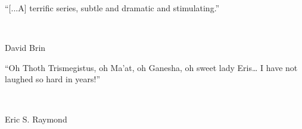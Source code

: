 \makeatletter
\newlength{\beforeblurbskip}
  \setlength{\beforeblurbskip}{.5\baselineskip}
\newlength{\afterblurbskip}
  \setlength{\afterblurbskip}{.5\baselineskip}
\newlength{\blurbwidth}
  \setlength{\blurbwidth}{.6\textwidth}
\newlength{\blurbrule}
  \setlength{\blurbrule}{.4\p@}
\newcommand{\blurbsize}{\small}
\newcommand{\blurbflush}{flushright}

\newcommand{\blurbfontsize}[1]{\def\blurbsize{#1}}
\newcommand{\blurbposition}[1]{\long\def\blurbflush{#1}}
\newcommand{\blurbtextposition}[1]{\def\textflush{#1}}
\newcommand{\blurbsourceposition}[1]{\def\sourceflush{#1}}

\newcommand{\@blurbrule}{\rule[.5ex]{\blurbwidth}{\blurbrule}}

\newcommand{\@blurbtext}[1]{%
  \begin{minipage}{\blurbwidth}\begin{\textflush} #1\par
    \ifdim\blurbrule>\z@ \@blurbrule \else \vspace*{1ex} \fi
  \end{\textflush}\end{minipage}}

  \newcommand{\@blurbsource}[1]{%
  \begin{minipage}{\blurbwidth}
    \begin{\sourceflush} #1\par
  \end{\sourceflush}\end{minipage}}

\newcommand{\blurb}[2]{
	\vspace{\beforeblurbskip} 
	{\blurbsize
	\begin{\blurbflush}
		\begin{minipage}{8cm} \@blurbtext{#1}\\ \@blurbsource{#2} \end{minipage}
	\end{\blurbflush} 
	\vspace{\afterblurbskip}}}
\makeatother

\thispagestyle{empty}
\blurb{“[...A] terrific series, subtle and dramatic and stimulating.”}{David Brin}
\blurb{“Oh Thoth Trismegistus, oh Ma’at, oh Ganesha, oh sweet lady Eris… I have not laughed so hard in years!”}{Eric S. Raymond}
\thispagestyle{empty}
